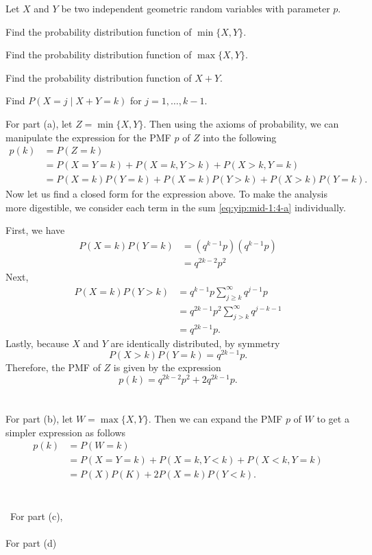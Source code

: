 \begin{problem}
  Let \(X\) and \(Y\) be two independent geometric random variables with
  parameter \(p\).
  \begin{alphlist}
  \item Find the probability distribution function of \(\min\{X,Y\}\).
  \item Find the probability distribution function of \(\max\{X,Y\}\).
  \item Find the probability distribution function of \(X+Y\).
  \item Find \(P(X=j\mid X+Y=k)\) for \(j=1,\dotsc,k-1\).
  \end{alphlist}
\end{problem}
\begin{solution*}
  For part (a), let \(Z=\min\{X,Y\}\). Then using the axioms of
  probability, we can manipulate the expression for the PMF \(p\) of \(Z\)
  into the following
  \begin{equation}
    \label{eq:yip:mid-1:4-a}
    \begin{aligned}
      p(k)
      &=P(Z=k)\\
      &=P(X=Y=k)+P(X=k,Y>k)+P(X>k,Y=k)\\
      &=P(X=k)P(Y=k)+P(X=k)P(Y>k)+P(X>k)P(Y=k).
    \end{aligned}
  \end{equation}
  Now let us find a closed form for the expression above. To make the
  analysis more digestible, we consider each term in the sum
  \eqref{eq:yip:mid-1:4-a} individually.

  First, we have
  \begin{align*}
    P(X=k)P(Y=k)
    &=(q^{k-1}p)(q^{k-1}p)\\
    &=q^{2k-2}p^2
  \end{align*}
  Next,
  \begin{align*}
    P(X=k)P(Y>k)
    &=q^{k-1}p\sum_{j\geq k}^\infty q^{j-1}p\\
    &=q^{2k-1}p^2\sum_{j>k}^\infty q^{j-k-1}\\
    &=q^{2k-1}p.
  \end{align*}
  Lastly, because \(X\) and \(Y\) are identically distributed, by symmetry
  \[
    P(X>k)P(Y=k)=q^{2k-1}p.
  \]
  Therefore, the PMF of \(Z\) is given by the expression
  \[
    p(k)=q^{2k-2}p^2+2q^{2k-1}p.
  \]
  \\\\
  For part (b), let \(W=\max\{X,Y\}\). Then we can expand the PMF \(p\) of
  \(W\) to get a simpler expression as follows
  \begin{align*}
    p(k)
    &=P(W=k)\\
    &=P(X=Y=k)+P(X=k,Y<k)+P(X<k,Y=k)\\
    &=P(X)P(K)+2P(X=k)P(Y<k).
  \end{align*}
  \\\\\
  For part (c),
  \\\\
  For part (d)
\end{solution*}

